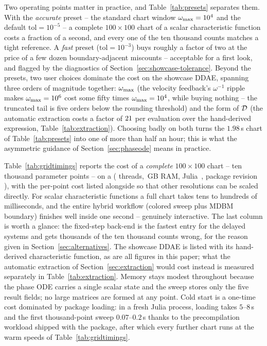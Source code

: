 Two operating points matter in practice, and Table~\ref{tab:presets}
separates them. With the \emph{accurate} preset -- the standard chart
window $\omega_{\mathrm{max}}=10^{4}$ and the default $\mathrm{tol}=10^{-5}$ -- a complete
$100\times100$ chart of a scalar characteristic function costs a fraction
of a second, and every one of the ten thousand counts matches a tight
reference. A \emph{fast} preset ($\mathrm{tol}=10^{-3}$) buys roughly a
factor of two at the price of a few dozen boundary-adjacent miscounts --
acceptable for a first look, and flagged by the diagnostics of
Section~\ref{sec:showcase-tolerance}. Beyond the presets, two user choices
dominate the cost on the showcase DDAE, spanning three orders of magnitude
together: $\omega_{\mathrm{max}}$ (the velocity feedback's $\omega^{-1}$ ripple makes
$\omega_{\mathrm{max}}=10^{6}$ cost some fifty times $\omega_{\mathrm{max}}=10^{4}$, while buying nothing
-- the truncated tail is five orders below the rounding threshold) and the
form of $\mathcal{D}$ (the automatic extraction costs a factor of $21$
per evaluation over the hand-derived expression,
Table~\ref{tab:extraction}). Choosing badly on both turns the $1.98$\,s
chart of Table~\ref{tab:presets} into one of more than half an hour; this is what the
asymmetric guidance of Section~\ref{sec:phaseode} means in practice.

Table~\ref{tab:gridtimings} reports the cost of a \emph{complete}
$100\times100$ chart -- ten thousand parameter points -- on a
\CPUmodel{} (\NumThreads{} threads, \RAMgb\,GB RAM, Julia~\JuliaVersion,
package revision \PkgCommit), with the per-point cost listed alongside so
that other resolutions can be scaled directly. For scalar characteristic
functions a full chart takes tens to hundreds of milliseconds, and the
entire hybrid workflow (colored sweep plus MDBM boundary) finishes well
inside one second -- genuinely interactive. The last column is worth a
glance: the fixed-step back-end is the fastest entry for the delayed systems
and gets thousands of the ten thousand counts wrong, for the reason given in
Section~\ref{sec:alternatives}. The showcase DDAE is listed with its
hand-derived characteristic function, as are all figures in this paper; what
the automatic extraction of Section~\ref{sec:extraction} would cost instead
is measured separately in Table~\ref{tab:extraction}. Memory stays modest throughout
because the phase ODE carries a single scalar state and the sweep stores
only the five result fields; no large matrices are formed at any point.
Cold start is a one-time cost dominated by package loading: in a fresh Julia
process, loading takes $5$--$8$\,s and the first thousand-point sweep
$0.07$--$0.2$\,s thanks to the precompilation workload shipped with the
package, after which every further chart runs at the warm speeds of
Table~\ref{tab:gridtimings}.

